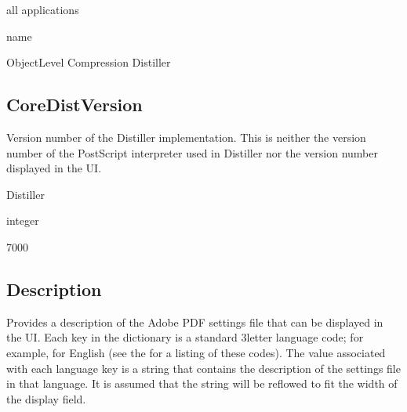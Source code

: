 \documentclass[letterpaper,12pt,english,openany,oneside]{sphinxmanual}
\begin{document}
all applications

\label{\detokenize{PDF_Create_CommonSettings:type-4}}

name

\label{\detokenize{PDF_Create_CommonSettings:ui-name-4}}

Object\sphinxhyphen{}Level Compression Distiller

\label{\detokenize{PDF_Create_CommonSettings:default-value-4}}

\begin{sphinxVerbatim}[commandchars=\\\{\}]
\end{sphinxVerbatim}


\subsection{CoreDistVersion}
\label{\detokenize{PDF_Create_CommonSettings:coredistversion}}
 Version number of the Distiller implementation. This is neither the version number of the PostScript interpreter used in Distiller nor the version number displayed in the UI.

\label{\detokenize{PDF_Create_CommonSettings:supported-by-5}}

Distiller

\label{\detokenize{PDF_Create_CommonSettings:type-5}}

integer

\label{\detokenize{PDF_Create_CommonSettings:default-value-5}}

7000




\subsection{Description}
\label{\detokenize{PDF_Create_CommonSettings:description}}
Provides a description of the Adobe PDF settings file that can be displayed in the UI. Each key in the dictionary is a standard 3\sphinxhyphen{}letter language code; for example,  for English (see the  for a listing of these codes). The value associated with each language key is a string that contains the description of the settings file in that language. It is assumed that the string will be reflowed to fit the width of the display field.
\end{document}
